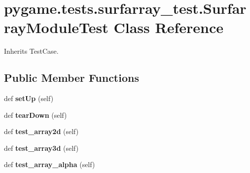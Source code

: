 \hypertarget{classpygame_1_1tests_1_1surfarray__test_1_1_surfarray_module_test}{}\section{pygame.\+tests.\+surfarray\+\_\+test.\+Surfarray\+Module\+Test Class Reference}
\label{classpygame_1_1tests_1_1surfarray__test_1_1_surfarray_module_test}


Inherits Test\+Case.

\subsection*{Public Member Functions}
\begin{DoxyCompactItemize}
\item 
\mbox{\label{classpygame_1_1tests_1_1surfarray__test_1_1_surfarray_module_test_ac6cd52526be460b302b6eb1e5b96dbc9}} 
def {\bfseries set\+Up} (self)
\item 
\mbox{\label{classpygame_1_1tests_1_1surfarray__test_1_1_surfarray_module_test_abd95ff7b078a08253cf29d3b73142512}} 
def {\bfseries tear\+Down} (self)
\item 
\mbox{\label{classpygame_1_1tests_1_1surfarray__test_1_1_surfarray_module_test_aca52a1dfe97382e3ea9f5216ff11429b}} 
def {\bfseries test\+\_\+array2d} (self)
\item 
\mbox{\label{classpygame_1_1tests_1_1surfarray__test_1_1_surfarray_module_test_a5c93089793c11a7ceb14afd9604c63c4}} 
def {\bfseries test\+\_\+array3d} (self)
\item 
\mbox{\label{classpygame_1_1tests_1_1surfarray__test_1_1_surfarray_module_test_a52d015f698383bc8ad0d6128d0e6fba1}} 
def {\bfseries test\+\_\+array\+\_\+alpha} (self)
\item 
\mbox{\label{classpygame_1_1tests_1_1surfarray__test_1_1_surfarray_module_test_ae6ac1f72a2d58da201dacc8453cfba55}} 

\end{DoxyCompactItemize}

